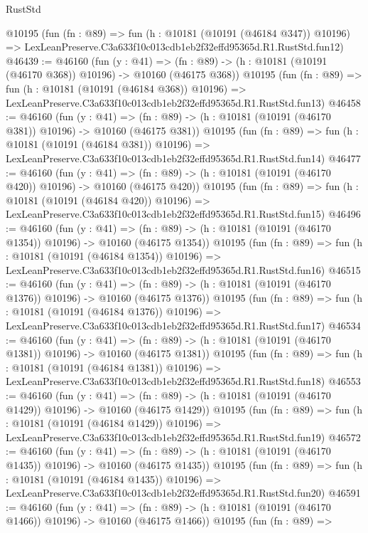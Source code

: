 \begin{lexlean}{RustStd}
\begin{coremodule}
    @10195
    (fun (fn : @89) =>
    fun (h : @10181 (@10191 (@46184 @347)) @10196) =>
    LexLeanPreserve.C3a633f10c013cdb1eb2f32effd95365d.R1.RustStd.fun12)
@46439 := @46160
    (fun (y : @41) =>
    (fn : @89) -> (h : @10181 (@10191 (@46170 @368)) @10196) -> @10160 (@46175 @368))
    @10195
    (fun (fn : @89) =>
    fun (h : @10181 (@10191 (@46184 @368)) @10196) =>
    LexLeanPreserve.C3a633f10c013cdb1eb2f32effd95365d.R1.RustStd.fun13)
@46458 := @46160
    (fun (y : @41) =>
    (fn : @89) -> (h : @10181 (@10191 (@46170 @381)) @10196) -> @10160 (@46175 @381))
    @10195
    (fun (fn : @89) =>
    fun (h : @10181 (@10191 (@46184 @381)) @10196) =>
    LexLeanPreserve.C3a633f10c013cdb1eb2f32effd95365d.R1.RustStd.fun14)
@46477 := @46160
    (fun (y : @41) =>
    (fn : @89) -> (h : @10181 (@10191 (@46170 @420)) @10196) -> @10160 (@46175 @420))
    @10195
    (fun (fn : @89) =>
    fun (h : @10181 (@10191 (@46184 @420)) @10196) =>
    LexLeanPreserve.C3a633f10c013cdb1eb2f32effd95365d.R1.RustStd.fun15)
@46496 := @46160
    (fun (y : @41) =>
    (fn : @89) -> (h : @10181 (@10191 (@46170 @1354)) @10196) -> @10160 (@46175 @1354))
    @10195
    (fun (fn : @89) =>
    fun (h : @10181 (@10191 (@46184 @1354)) @10196) =>
    LexLeanPreserve.C3a633f10c013cdb1eb2f32effd95365d.R1.RustStd.fun16)
@46515 := @46160
    (fun (y : @41) =>
    (fn : @89) -> (h : @10181 (@10191 (@46170 @1376)) @10196) -> @10160 (@46175 @1376))
    @10195
    (fun (fn : @89) =>
    fun (h : @10181 (@10191 (@46184 @1376)) @10196) =>
    LexLeanPreserve.C3a633f10c013cdb1eb2f32effd95365d.R1.RustStd.fun17)
@46534 := @46160
    (fun (y : @41) =>
    (fn : @89) -> (h : @10181 (@10191 (@46170 @1381)) @10196) -> @10160 (@46175 @1381))
    @10195
    (fun (fn : @89) =>
    fun (h : @10181 (@10191 (@46184 @1381)) @10196) =>
    LexLeanPreserve.C3a633f10c013cdb1eb2f32effd95365d.R1.RustStd.fun18)
@46553 := @46160
    (fun (y : @41) =>
    (fn : @89) -> (h : @10181 (@10191 (@46170 @1429)) @10196) -> @10160 (@46175 @1429))
    @10195
    (fun (fn : @89) =>
    fun (h : @10181 (@10191 (@46184 @1429)) @10196) =>
    LexLeanPreserve.C3a633f10c013cdb1eb2f32effd95365d.R1.RustStd.fun19)
@46572 := @46160
    (fun (y : @41) =>
    (fn : @89) -> (h : @10181 (@10191 (@46170 @1435)) @10196) -> @10160 (@46175 @1435))
    @10195
    (fun (fn : @89) =>
    fun (h : @10181 (@10191 (@46184 @1435)) @10196) =>
    LexLeanPreserve.C3a633f10c013cdb1eb2f32effd95365d.R1.RustStd.fun20)
@46591 := @46160
    (fun (y : @41) =>
    (fn : @89) -> (h : @10181 (@10191 (@46170 @1466)) @10196) -> @10160 (@46175 @1466))
    @10195
    (fun (fn : @89) =>

\end{coremodule}
\end{lexlean}
